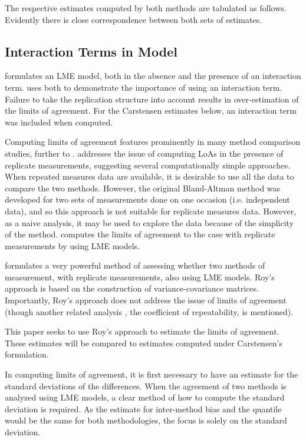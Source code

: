 \documentclass[12pt, a4paper]{report}
\theoremstyle{plain}
\theoremstyle{definition}
\theoremstyle{remark}
\begin{document}
The respective estimates computed by both methods are tabulated as follows. Evidently there is close correspondence between both sets of estimates.




\subsection{Interaction Terms in Model}
\citet{BXC2008} formulates an LME model, both in the absence and the presence of an interaction term.\citet{bxc} uses both to demonstrate the importance of using an interaction term. Failure to take the replication structure into
account results in over-estimation of the limits of agreement. For the Carstensen estimates below, an interaction term was included when computed.
\newpage

Computing limits of agreement features prominently in many method comparison studies, further to \citet{BA86,BA99}.
\citet{BA99} addresses the issue of computing LoAs in the presence of replicate measurements, suggesting several computationally simple approaches. When repeated measures data are available, it is desirable to use
all the data to compare the two methods. However, the original Bland-Altman method was developed for two sets of measurements done on one occasion (i.e. independent data), and so this approach is not suitable for replicate measures data. However, as a naive analysis, it may be used to explore the data because of the simplicity of the method.
\citet{bxc2008}  computes the limits of agreement to the case with replicate measurements by using LME models.

\citet{Roy} formulates a very powerful method of assessing whether two methods of measurement, with replicate measurements, also using LME models. Roy's approach is based on the construction of variance-covariance matrices.
Importantly, Roy's approach does not address the issue of limits of agreement (though another related analysis , the coefficient of repeatability, is mentioned).

This paper seeks to use Roy's approach to estimate the limits of agreement. These estimates will be compared to estimates computed under Carstensen's formulation.

In computing limits of agreement, it is first necessary to have an estimate for the standard deviations of the differences. When the agreement of two methods is analyzed using LME models, a clear method of how to compute the standard deviation is required. As the estimate for inter-method bias and the quantile would be the same for both methodologies, the focus is solely on the standard deviation.
\end{document}
